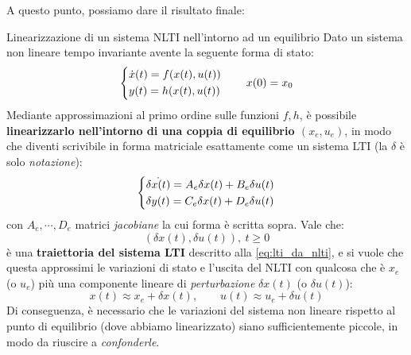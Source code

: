 \documentclass[a4paper]{report}
\begin{document}
\newpage
A questo punto, possiamo dare il risultato finale:
\begin{defin}{Linearizzazione di un sistema NLTI nell'intorno ad un equilibrio}{}{}
	Dato un sistema non lineare tempo invariante avente la seguente forma di stato:
\begin{equation*}
	\begin{dcases}
	\dot x(t) = f(x(t),u(t)) \\
	y(t) = h(x(t), u(t))
\end{dcases}
 \quad \quad x(0) = x_0
	\end{equation*}
	Mediante approssimazioni al primo ordine sulle funzioni $f,h$, è possibile \textbf{linearizzarlo nell'intorno di una coppia di equilibrio $(x_e, u_e)$}, in modo che diventi scrivibile in forma matriciale esattamente come un sistema LTI (la $\delta$ è solo \textit{notazione}):
\begin{equation}
\label{eq:lti_da_nlti}
	\begin{dcases}
		\dot{\delta x(t)} = A_e \delta x(t) + B_e \delta u(t) \\
		\delta y(t) = C_e \delta x(t) + D_e \delta u(t)
	\end{dcases}
	\end{equation}
	con $A_e,\cdots, D_e$ matrici \textit{jacobiane} la cui forma è scritta sopra. 
	Vale che:
	\begin{equation}
		(\delta x(t), \delta u(t)), \ t \geq 0
	\end{equation}
	è una \textbf{traiettoria del sistema LTI} descritto alla \eqref{eq:lti_da_nlti}, e si vuole che questa approssimi le variazioni di stato e l'uscita del NLTI con qualcosa che è $x_e$ (o $u_e$) più una componente lineare di \textit{perturbazione} $\delta x(t)$ (o $\delta u(t)$):
\begin{equation}
		x(t) \approx x_e + \delta x(t), \quad \quad u(t) \approx u_e + \delta u(t)
	\end{equation}
	Di conseguenza, è necessario che le variazioni del sistema non lineare rispetto al punto di equilibrio (dove abbiamo linearizzato) siano sufficientemente piccole, in modo da riuscire a \textit{confonderle}. 
	\end{defin}
	
\end{document}
